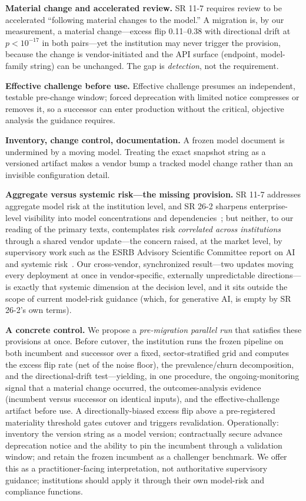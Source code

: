 \documentclass[10pt,twocolumn]{article}
\begin{document}
\noindent\textbf{Material change and accelerated review.} SR 11-7 requires review to be accelerated ``following material changes to the model.'' A migration is, by our measurement, a material change---excess flip 0.11--0.38 with directional drift at $p<10^{-17}$ in both pairs---yet the institution may never trigger the provision, because the change is vendor-initiated and the API surface (endpoint, model-family string) can be unchanged. The gap is \emph{detection}, not the requirement.

\noindent\textbf{Effective challenge before use.} Effective challenge presumes an independent, testable pre-change window; forced deprecation with limited notice compresses or removes it, so a successor can enter production without the critical, objective analysis the guidance requires.

\noindent\textbf{Inventory, change control, documentation.} A frozen model document is undermined by a moving model. Treating the exact snapshot string as a versioned artifact makes a vendor bump a tracked model change rather than an invisible configuration detail.

\noindent\textbf{Aggregate versus systemic risk---the missing provision.} SR 11-7 addresses aggregate model risk at the institution level, and SR 26-2 sharpens enterprise-level visibility into model concentrations and dependencies~\cite{sr2602}; but neither, to our reading of the primary texts, contemplates risk \emph{correlated across institutions} through a shared vendor update---the concern raised, at the market level, by supervisory work such as the ESRB Advisory Scientific Committee report on AI and systemic risk~\cite{esrb}. Our cross-vendor, synchronized result---two updates moving every deployment at once in vendor-specific, externally unpredictable directions---is exactly that systemic dimension at the decision level, and it sits outside the scope of current model-risk guidance (which, for generative AI, is empty by SR 26-2's own terms).

\noindent\textbf{A concrete control.} We propose a \emph{pre-migration parallel run} that satisfies these provisions at once. Before cutover, the institution runs the frozen pipeline on both incumbent and successor over a fixed, sector-stratified grid and computes the excess flip rate (net of the noise floor), the prevalence/churn decomposition, and the directional-drift test---yielding, in one procedure, the ongoing-monitoring signal that a material change occurred, the outcomes-analysis evidence (incumbent versus successor on identical inputs), and the effective-challenge artifact before use. A directionally-biased excess flip above a pre-registered materiality threshold gates cutover and triggers revalidation. Operationally: inventory the version string as a model version; contractually secure advance deprecation notice and the ability to pin the incumbent through a validation window; and retain the frozen incumbent as a challenger benchmark. We offer this as a practitioner-facing interpretation, not authoritative supervisory guidance; institutions should apply it through their own model-risk and compliance functions.
\end{document}

